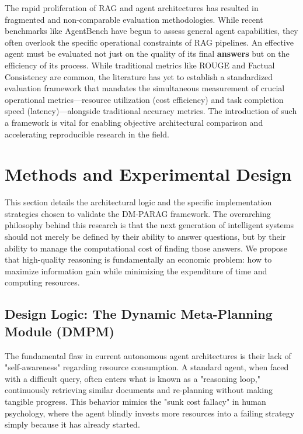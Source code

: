 \documentclass[12pt,en]{elegantpaper}
\begin{document}
The rapid proliferation of RAG and agent architectures has resulted in fragmented and non-comparable evaluation methodologies. While recent benchmarks like AgentBench \cite{liu2024agentbench} have begun to assess general agent capabilities, they often overlook the specific operational constraints of RAG pipelines. An effective agent must be evaluated not just on the quality of its final \textbf{answers} but on the efficiency of its process. While traditional metrics like ROUGE \cite{lin2004rouge} and Factual Consistency \cite{kryscinski2020evaluating} are common, the literature has yet to establish a standardized evaluation framework that mandates the simultaneous measurement of crucial operational metrics—resource utilization (cost efficiency) and task completion speed (latency)—alongside traditional accuracy metrics. The introduction of such a framework is vital for enabling objective architectural comparison and accelerating reproducible research in the field.

\section{Methods and Experimental Design}

This section details the architectural logic and the specific implementation strategies chosen to validate the DM-PARAG framework. The overarching philosophy behind this research is that the next generation of intelligent systems should not merely be defined by their ability to answer questions, but by their ability to manage the computational cost of finding those answers. We propose that high-quality reasoning is fundamentally an economic problem: how to maximize information gain while minimizing the expenditure of time and computing resources.

\subsection{Design Logic: The Dynamic Meta-Planning Module (DMPM)}

The fundamental flaw in current autonomous agent architectures is their lack of "self-awareness" regarding resource consumption. A standard agent, when faced with a difficult query, often enters what is known as a "reasoning loop," continuously retrieving similar documents and re-planning without making tangible progress. This behavior mimics the "sunk cost fallacy" in human psychology, where the agent blindly invests more resources into a failing strategy simply because it has already started.
\end{document}
